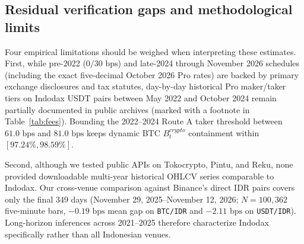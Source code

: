 \subsection{Residual verification gaps and methodological limits}
Four empirical limitations should be weighed when interpreting these estimates. First, while pre-2022 ($0/30\text{ bps}$) and late-2024 through November 2026 schedules (including the exact five-decimal October 2026 Pro rates) are backed by primary exchange disclosures and tax statutes, day-by-day historical Pro maker/taker tiers on Indodax USDT pairs between May 2022 and October 2024 remain partially documented in public archives (marked with a footnote in Table~\ref{tab:fees}). Bounding the 2022--2024 Route A taker threshold between $61.0\text{ bps}$ and $81.0\text{ bps}$ keeps dynamic BTC $B_t^{crypto}$ containment within $[97.24\%, 98.59\%]$.

Second, although we tested public APIs on Tokocrypto, Pintu, and Reku, none provided downloadable multi-year historical OHLCV series comparable to Indodax. Our cross-venue comparison against Binance's direct IDR pairs covers only the final 349 days (November 29, 2025--November 12, 2026; $N = 100,362$ five-minute bars, $-0.19\text{ bps}$ mean gap on \texttt{BTC/IDR} and $-2.11\text{ bps}$ on \texttt{USDT/IDR}). Long-horizon inferences across 2021--2025 therefore characterize Indodax specifically rather than all Indonesian venues.

